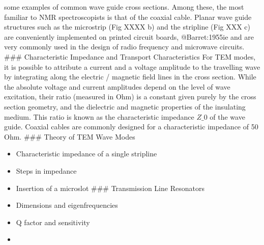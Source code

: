 some examples of common wave guide cross sections. Among these, the most
familiar to NMR spectroscopists is that of the coaxial cable. Planar
wave guide structures such as the microstrip (Fig XXXX b) and the
stripline (Fig XXX c) are conveniently implemented on printed circuit
boards, @Barret:1955ie and are very commonly used in the design of radio
frequency and microwave circuits. \#\#\# Characteristic Impedance and
Transport Characteristics For TEM modes, it is possible to attribute a
current and a voltage amplitude to the travelling wave by integrating
along the electric / magnetic field lines in the cross section. While
the absolute voltage and current amplitudes depend on the level of wave
excitation, their ratio (measured in Ohm) is a constant given purely by
the cross section geometry, and the dielectric and magnetic properties
of the insulating medium. This ratio is known as the characteristic
impedance \(Z\_0\) of the wave guide. Coaxial cables are commonly
designed for a characteristic impedance of 50 Ohm. \#\#\# Theory of TEM
Wave Modes

\begin{itemize}
\item
  Characteristic impedance of a single stripline
\item
  Steps in impedance
\item
  Insertion of a microslot \#\#\# Transmission Line Resonators
\item
  Dimensions and eigenfrequencies
\item
  Q factor and sensitivity
\item
\end{itemize}

